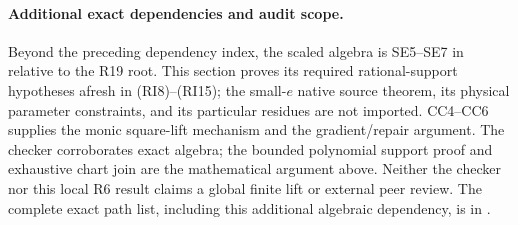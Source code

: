\paragraph{Additional exact dependencies and audit scope.}
Beyond the preceding dependency index, the scaled algebra is SE5--SE7
in  relative to the R19
root. This section proves its required rational-support hypotheses
afresh in (RI8)--(RI15); the small-$e$ native source theorem, its
physical parameter constraints, and its particular residues are not
imported. CC4--CC6 supplies the monic square-lift mechanism and the
gradient/repair argument. The checker corroborates exact algebra;
the bounded polynomial support proof and exhaustive chart join are
the mathematical argument above. Neither the checker nor this local
R6 result claims a global finite lift or external peer review.
The complete exact path list, including this additional algebraic
dependency, is in .
